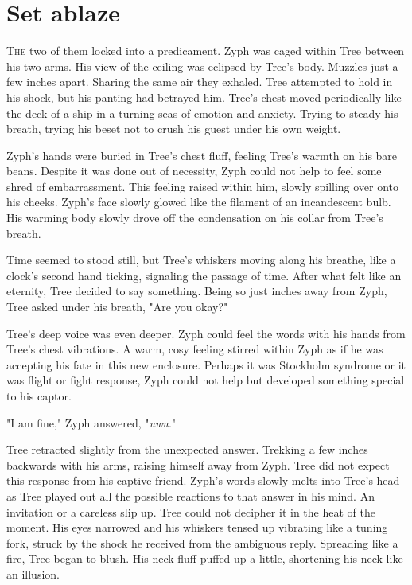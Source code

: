 \chapter{Set ablaze}

\lettrine{T}{he} two of them locked into a predicament. Zyph was caged within Tree between his two arms. His view of the ceiling was eclipsed by Tree's body. Muzzles just a few inches apart. Sharing the same air they exhaled. Tree attempted to hold in his shock, but his panting had betrayed him. Tree's chest moved periodically like the deck of a ship in a turning seas of emotion and anxiety. Trying to steady his breath, trying his beset not to crush his guest under his own weight.

Zyph's hands were buried in Tree's chest fluff, feeling Tree's warmth on his bare beans. Despite it was done out of necessity, Zyph could not help to feel some shred of embarrassment. This feeling raised within him, slowly spilling over onto his cheeks. Zyph's face slowly glowed like the filament of an incandescent bulb. His warming body slowly drove off the condensation on his collar from Tree's breath.

Time seemed to stood still, but Tree's whiskers moving along his breathe, like a clock's second hand ticking, signaling the passage of time. After what felt like an eternity, Tree decided to say something. Being so just inches away from Zyph, Tree asked under his breath, "Are you okay?"

Tree's deep voice was even deeper. Zyph could feel the words with his hands from Tree's chest vibrations. A warm, cosy feeling stirred within Zyph as if he was accepting his fate in this new enclosure. Perhaps it was Stockholm syndrome or it was flight or fight response, Zyph could not help but developed something special to his captor.

"I am fine," Zyph answered, "\emph{uwu}."

Tree retracted slightly from the unexpected answer. Trekking a few inches backwards with his arms, raising himself away from Zyph. Tree did not expect this response from his captive friend. Zyph's words slowly melts into Tree's head as Tree played out all the possible reactions to that answer in his mind. An invitation or a careless slip up. Tree could not decipher it in the heat of the moment.  His eyes narrowed and his whiskers tensed up vibrating like a tuning fork, struck by the shock he received from the ambiguous reply. Spreading like a fire, Tree began to blush. His neck fluff puffed up a little, shortening his neck like an illusion.

